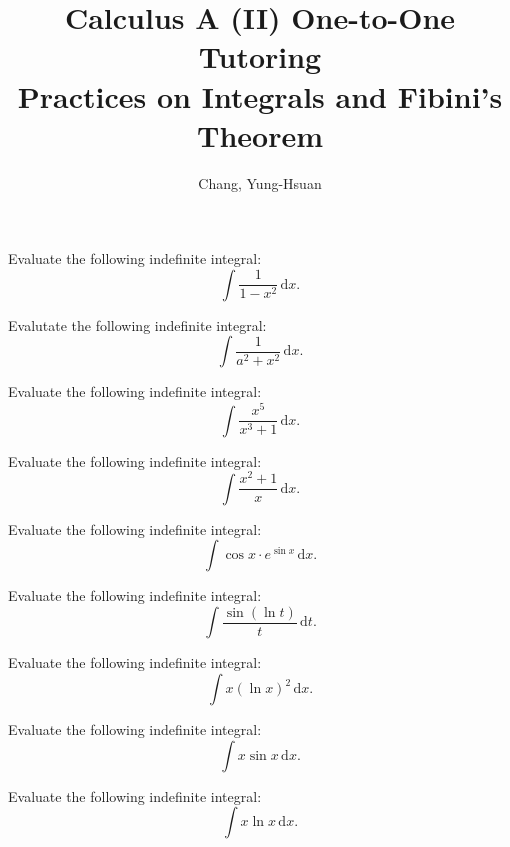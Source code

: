 \documentclass[11pt]{article}
\title{\textbf{Calculus A (II) One-to-One Tutoring}\\ \Large Practices on Integrals and Fibini's Theorem}
\author{Chang, Yung-Hsuan}
\theoremstyle{break}
\theoremstyle{no_label}
\newcommand{\ddi}{\text{$\,$d}}
\numberwithin{equation}{theorem}
\begin{document}
\maketitle

\begin{example}
    Evaluate the following indefinite integral: $$\int \dfrac{1}{1-x^2}\ddi x.$$
\end{example}
\vspace{10em}

\begin{example}
    Evalutate the following indefinite integral: $$\int \dfrac{1}{a^2+x^2}\ddi x.$$
\end{example}
\vspace{10em}

\begin{example}
    Evaluate the following indefinite integral: $$\int \dfrac{x^5}{x^3+1}\ddi x.$$
\end{example}
\vspace{10em}

\begin{example}
    Evaluate the following indefinite integral: $$\int \dfrac{x^2+1}{x}\ddi x.$$
\end{example}
\vspace{10em}

\begin{example}
    Evaluate the following indefinite integral: $$\int \cos x\cdot e^{\sin x}\ddi x.$$
\end{example}
\vspace{10em}

\begin{example}
    Evaluate the following indefinite integral: $$\int\dfrac{\sin(\ln t)}{t}\ddi t.$$
\end{example}
\vspace{10em}

\begin{example}
    Evaluate the following indefinite integral: $$\int x(\ln x)^2\ddi x.$$
\end{example}
\vspace{10em}

\begin{example}
    Evaluate the following indefinite integral: $$\int x\sin x\ddi x.$$
\end{example}
\vspace{10em}

\begin{example}
    Evaluate the following indefinite integral: $$\int x\ln x\ddi x.$$
\end{example}
\vspace{10em}
\end{document}
